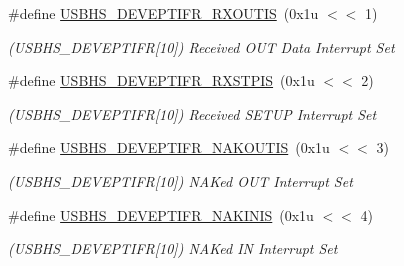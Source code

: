 \begin{DoxyCompactItemize}
\mbox{\label{group__SAMV71__USBHS_gaef3d6bfad543d172ba059744c175190e}} 
\#define \mbox{\hyperlink{group__SAMV71__USBHS_gaef3d6bfad543d172ba059744c175190e}{U\+S\+B\+H\+S\+\_\+\+D\+E\+V\+E\+P\+T\+I\+F\+R\+\_\+\+R\+X\+O\+U\+T\+IS}}~(0x1u $<$$<$ 1)
\begin{DoxyCompactList}\small\item\em (U\+S\+B\+H\+S\+\_\+\+D\+E\+V\+E\+P\+T\+I\+FR\mbox{[}10\mbox{]}) Received O\+UT Data Interrupt Set \end{DoxyCompactList}\item 
\mbox{\label{group__SAMV71__USBHS_ga974795f10c7e14d470d001c948a74803}} 
\#define \mbox{\hyperlink{group__SAMV71__USBHS_ga974795f10c7e14d470d001c948a74803}{U\+S\+B\+H\+S\+\_\+\+D\+E\+V\+E\+P\+T\+I\+F\+R\+\_\+\+R\+X\+S\+T\+P\+IS}}~(0x1u $<$$<$ 2)
\begin{DoxyCompactList}\small\item\em (U\+S\+B\+H\+S\+\_\+\+D\+E\+V\+E\+P\+T\+I\+FR\mbox{[}10\mbox{]}) Received S\+E\+T\+UP Interrupt Set \end{DoxyCompactList}\item 
\mbox{\label{group__SAMV71__USBHS_ga7a7af5d0054bf3e037f35ccc1c952906}} 
\#define \mbox{\hyperlink{group__SAMV71__USBHS_ga7a7af5d0054bf3e037f35ccc1c952906}{U\+S\+B\+H\+S\+\_\+\+D\+E\+V\+E\+P\+T\+I\+F\+R\+\_\+\+N\+A\+K\+O\+U\+T\+IS}}~(0x1u $<$$<$ 3)
\begin{DoxyCompactList}\small\item\em (U\+S\+B\+H\+S\+\_\+\+D\+E\+V\+E\+P\+T\+I\+FR\mbox{[}10\mbox{]}) N\+A\+Ked O\+UT Interrupt Set \end{DoxyCompactList}\item 
\mbox{\label{group__SAMV71__USBHS_ga053fa6b866c9381fa1de30765cbd3408}} 
\#define \mbox{\hyperlink{group__SAMV71__USBHS_ga053fa6b866c9381fa1de30765cbd3408}{U\+S\+B\+H\+S\+\_\+\+D\+E\+V\+E\+P\+T\+I\+F\+R\+\_\+\+N\+A\+K\+I\+N\+IS}}~(0x1u $<$$<$ 4)
\begin{DoxyCompactList}\small\item\em (U\+S\+B\+H\+S\+\_\+\+D\+E\+V\+E\+P\+T\+I\+FR\mbox{[}10\mbox{]}) N\+A\+Ked IN Interrupt Set \end{DoxyCompactList}\item 
\mbox{\label{group__SAMV71__USBHS_ga5f6aa026b3b128a93676d9c9d91d18ef}} 

\end{DoxyCompactItemize}
